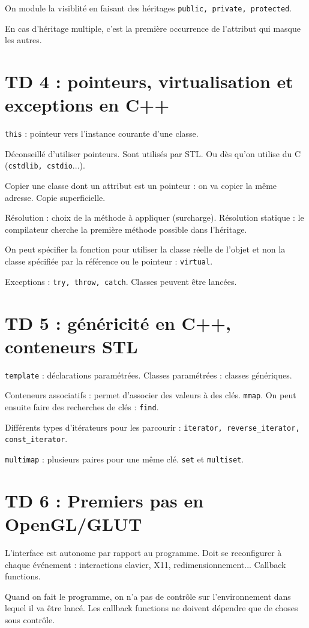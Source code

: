 \documentclass[french]{article}
\def\code#1{\texttt{#1}}
\begin{document}
On module la visiblité en faisant des héritages \code{public, private, protected}.

En cas d'héritage multiple, c’est la première occurrence de l’attribut qui masque les autres.


\section*{TD 4 : pointeurs, virtualisation et exceptions en C++}
\code{this} : pointeur vers l'instance courante d'une classe.

Déconseillé d'utiliser pointeurs. Sont utilisés par STL. Ou dès qu'on utilise du C (\code{cstdlib, cstdio}...).

Copier une classe dont un attribut est un pointeur : on va copier la même adresse. Copie superficielle.

Résolution : choix de la méthode à appliquer (surcharge). Résolution statique : le compilateur cherche la première méthode possible dans l'héritage.

On peut spécifier la fonction pour utiliser la classe réelle de l'objet et non la classe spécifiée par la référence ou le pointeur : \code{virtual}.

Exceptions : \code{try, throw, catch}. Classes peuvent être lancées.

\section*{TD 5 : généricité en C++, conteneurs STL}
\code{template} : déclarations paramétrées. Classes paramétrées : classes génériques.

Conteneurs associatifs : permet d'associer des valeurs à des clés. \code{mmap}. On peut ensuite faire des recherches de clés : \code{find}.

Différents types d'itérateurs pour les parcourir : \code{iterator, reverse\_iterator, const\_iterator}.

\code{multimap} : plusieurs paires pour une même clé. \code{set} et \code{multiset}.

\section*{TD 6 : Premiers pas en OpenGL/GLUT}
L'interface est autonome par rapport au programme. Doit se reconfigurer à chaque événement : interactions clavier, X11, redimensionnement... Callback functions.

Quand on fait le programme, on n'a pas de contrôle sur l'environnement dans lequel il va être lancé. Les callback functions ne doivent dépendre que de choses sous contrôle.
\end{document}
